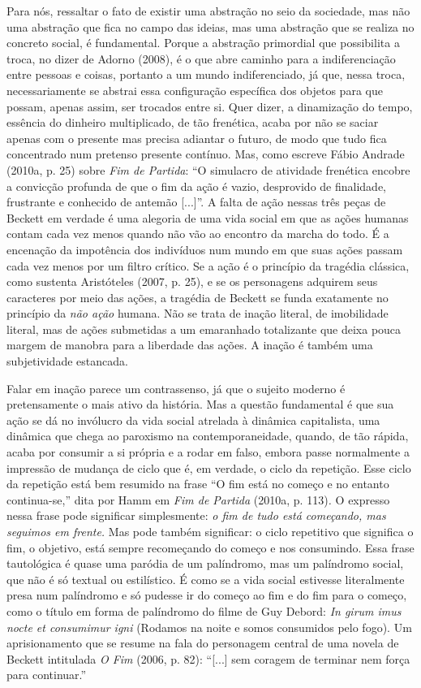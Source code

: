 Para nós, ressaltar o fato de existir uma abstração no seio da
sociedade, mas não uma abstração que fica no campo das ideias, mas uma
abstração que se realiza no concreto social, é fundamental. Porque a
abstração primordial que possibilita a troca, no dizer de Adorno (2008),
é o que abre caminho para a indiferenciação entre pessoas e coisas,
portanto a um mundo indiferenciado, já que, nessa troca, necessariamente
se abstrai essa configuração específica dos objetos para que possam,
apenas assim, ser trocados entre si. Quer dizer, a dinamização do tempo,
essência do dinheiro multiplicado, de tão frenética, acaba por não se
saciar apenas com o presente mas precisa adiantar o futuro, de modo que
tudo fica concentrado num pretenso presente contínuo. Mas, como escreve
Fábio Andrade (2010a, p. 25) sobre \emph{Fim de Partida}: ``O simulacro
de atividade frenética encobre a convicção profunda de que o fim da ação
é vazio, desprovido de finalidade, frustrante e conhecido de antemão
{[}...{]}''. A falta de ação nessas três peças de Beckett em verdade é
uma alegoria de uma vida social em que as ações humanas contam cada vez
menos quando não vão ao encontro da marcha do todo. É a encenação da
impotência dos indivíduos num mundo em que suas ações passam cada vez
menos por um filtro crítico. Se a ação é o princípio da tragédia
clássica, como sustenta Aristóteles (2007, p. 25), e se os personagens
adquirem seus caracteres por meio das ações, a tragédia de Beckett se
funda exatamente no princípio da \emph{não ação} humana. Não se trata de
inação literal, de imobilidade literal, mas de ações submetidas a um
emaranhado totalizante que deixa pouca margem de manobra para a
liberdade das ações. A inação é também uma subjetividade estancada.

Falar em inação parece um contrassenso, já que o sujeito moderno é
pretensamente o mais ativo da história. Mas a questão fundamental é que
sua ação se dá no invólucro da vida social atrelada à dinâmica
capitalista, uma dinâmica que chega ao paroxismo na contemporaneidade,
quando, de tão rápida, acaba por consumir a si própria e a rodar em
falso, embora passe normalmente a impressão de mudança de ciclo que é,
em verdade, o ciclo da repetição. Esse ciclo da repetição está bem
resumido na frase ``O fim está no começo e no entanto continua-se,''
dita por Hamm em \emph{Fim de Partida} (2010a, p. 113)\emph{.} O
expresso nessa frase pode significar simplesmente: \emph{o fim de tudo
está começando, mas seguimos em frente.} Mas pode também significar: o
ciclo repetitivo que significa o fim, o objetivo, está sempre
recomeçando do começo e nos consumindo. Essa frase tautológica é quase
uma paródia de um palíndromo, mas um palíndromo social, que não é só
textual ou estilístico. É como se a vida social estivesse literalmente
presa num palíndromo e só pudesse ir do começo ao fim e do fim para o
começo, como o título em forma de palíndromo do filme de Guy Debord:
\emph{In girum imus nocte et consumimur igni} (Rodamos na noite e somos
consumidos pelo fogo). Um aprisionamento que se resume na fala do
personagem central de uma novela de Beckett intitulada \emph{O Fim}
(2006, p. 82): ``{[}...{]} sem coragem de terminar nem força para
continuar.''

